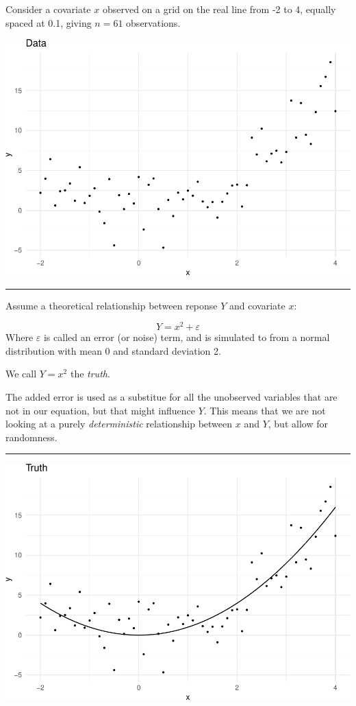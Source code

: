 \documentclass[]{article}
\begin{document}
Consider a covariate \(x\) observed on a grid on the real line from -2
to 4, equally spaced at 0.1, giving \(n=61\) observations.

\includegraphics{2StatLearn_files/figure-latex/data-1.pdf}

\begin{center}\rule{0.5\linewidth}{\linethickness}\end{center}

Assume a theoretical relationship between reponse \(Y\) and covariate
\(x\):

\[ Y=x^2 + \varepsilon\] Where \(\varepsilon\) is called an error (or
noise) term, and is simulated to from a normal distribution with mean 0
and standard deviation 2.

We call \(Y=x^2\) the \emph{truth}.

The added error is used as a substitue for all the unobserved variables
that are not in our equation, but that might influence \(Y\). This means
that we are not looking at a purely \emph{deterministic} relationship
between \(x\) and \(Y\), but allow for randomness.

\begin{center}\rule{0.5\linewidth}{\linethickness}\end{center}

\includegraphics{2StatLearn_files/figure-latex/truth-1.pdf}
\end{document}
